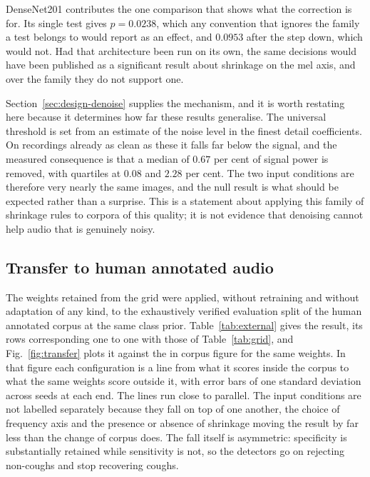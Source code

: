 \documentclass{ieeeaccess}
\newcommand{\figref}[1]{Fig.~\ref{#1}}
\begin{document}
DenseNet201 contributes the one comparison that shows what the correction is for. Its
single test gives $p = 0.0238$, which any convention that ignores the family a test
belongs to would report as an effect, and $0.0953$ after the step down, which would not.
Had that architecture been run on its own, the same decisions would have been published as
a significant result about shrinkage on the mel axis, and over the family they do not
support one.

Section~\ref{sec:design-denoise} supplies the mechanism, and it is worth restating here
because it determines how far these results generalise. The universal threshold is set
from an estimate of the noise level in the finest detail coefficients. On recordings
already as clean as these it falls far below the signal, and the measured consequence is
that a median of $0.67$ per cent of signal power is removed, with quartiles at $0.08$ and
$2.28$ per cent. The two input conditions are therefore very nearly the same images, and
the null result is what should be expected rather than a surprise. This is a statement
about applying this family of shrinkage rules to corpora of this quality; it is not
evidence that denoising cannot help audio that is genuinely noisy.

\subsection{Transfer to human annotated audio}\label{sec:res-external}

The weights retained from the grid were applied, without retraining and without adaptation
of any kind, to the exhaustively verified evaluation split of the human annotated corpus
at the same class prior. Table~\ref{tab:external} gives the result, its rows corresponding one to one with
those of Table~\ref{tab:grid}, and \figref{fig:transfer} plots it against the in corpus
figure for the same weights. In that figure each configuration is a line from what it
scores inside the corpus to what the same weights score outside it, with error bars
of one standard deviation across seeds at each end. The lines run close to
parallel. The input conditions are not labelled separately because they fall on
top of one another, the choice of frequency axis and the presence or absence of
shrinkage moving the result by far less than the change of corpus does.
The fall itself is asymmetric: specificity is substantially retained while sensitivity
is not, so the detectors go on rejecting non-coughs and stop recovering coughs.
\end{document}
